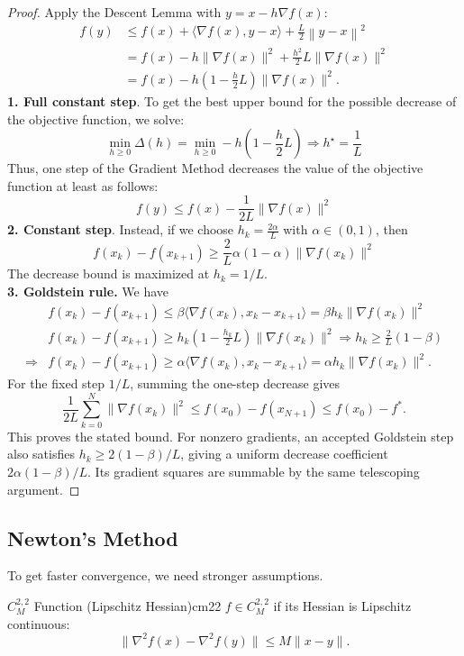 \documentclass[11pt]{article}
\begin{document}
\begin{proof}[Proof]
    Apply the Descent Lemma with $y = x-h\nabla f(x)$:
    \begin{align*}
        f(y) &\le f(x) + \langle \nabla f(x), y-x \rangle + \frac{L}{2} \left\| y-x \right\|^2\\
        &=f(x)-h\|\nabla f(x)\|^2 +\frac{h^2}{2}L\|\nabla f(x)\|^2\\
        &=f(x)-h(1-\frac{h}{2}L)\|\nabla f(x)\|^2.
    \end{align*} 
    \textbf{1. Full constant step}.\quad
    To get the best upper bound for the possible decrease of the objective function, we solve:
    $$\min_{h\geq0}\Delta (h)=\min_{h\geq0}-h(1-\frac{h}{2}L)\Rightarrow h^\star=\frac{1}{L}$$
    Thus, one step of the Gradient Method decreases the value of the objective function at least as follows:
    $$f(y)\leq f(x)-\frac{1}{2L}\|\nabla f(x)\|^2$$
    \textbf{2. Constant step}.\quad
    Instead, if we choose $h_k=\frac{2\alpha}{L}$ with $\alpha\in (0,1)$, then
    $$f(x_k)-f(x_{k+1})\geq \frac{2}{L}\alpha(1-\alpha)\|\nabla f(x_k)\|^2$$
    The decrease bound is maximized at $h_k=1/L$.
    \\\textbf{3. Goldstein rule.}\quad
    We have
    \begin{align*}
    &f(x_k)-f(x_{k+1})\leq \beta\langle\nabla f(x_k),x_k-x_{k+1}\rangle=\beta h_k\|\nabla f(x_k)\|^2\\
    &f(x_k)-f(x_{k+1})\geq h_k(1-\frac{h_k}{2}L)\|\nabla f(x_k)\|^2\Rightarrow h_k\geq\frac{2}{L}(1-\beta)\\
    \Rightarrow&f(x_k)-f(x_{k+1})\geq \alpha\langle\nabla f(x_k),x_k-x_{k+1}\rangle=\alpha h_k\|\nabla f (x_k)\|^2.\end{align*}
For the fixed step $1/L$, summing the one-step decrease gives
\[
\frac{1}{2L}\sum_{k=0}^N\|\nabla f(x_k)\|^2
\le f(x_0)-f(x_{N+1})\le f(x_0)-f^*.
\]
This proves the stated bound. For nonzero gradients, an accepted Goldstein step also satisfies $h_k\ge2(1-\beta)/L$, giving a uniform decrease coefficient $2\alpha(1-\beta)/L$. Its gradient squares are summable by the same telescoping argument.
\end{proof}

\subsection{Newton's Method}

To get faster convergence, we need stronger assumptions.

\begin{definition}{$C_M^{2,2}$ Function (Lipschitz Hessian)}{cm22}
    $f \in C_M^{2,2}$ if its Hessian is Lipschitz continuous:
    \[ \|\nabla^2 f(x) - \nabla^2 f(y)\| \le M \|x-y\|. \]
\end{definition}
\end{document}
